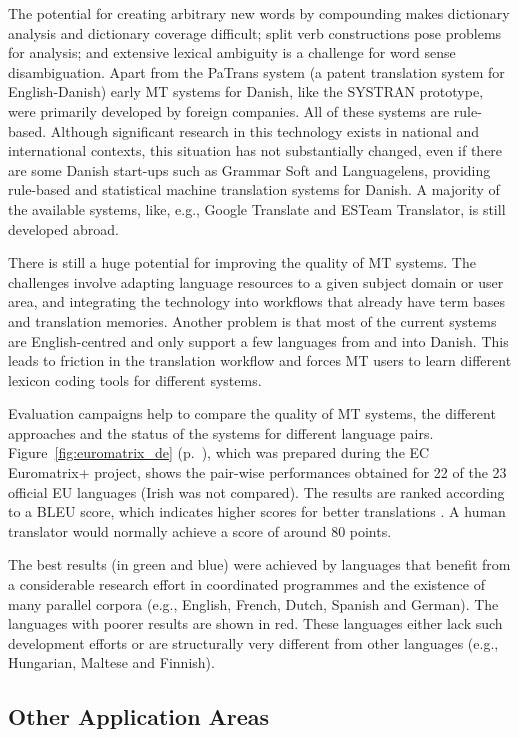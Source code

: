 \begin{multicols}{2}
The potential for creating arbitrary new words by compounding makes dictionary analysis and dictionary coverage difficult; split verb constructions pose problems for analysis; and extensive lexical ambiguity is a challenge for word sense disambiguation.
Apart from the PaTrans system (a patent translation system for English-Danish) early MT systems for Danish, like the SYSTRAN prototype, were primarily developed by foreign companies.
All of these systems are rule-based. Although significant research in this technology exists in national and international contexts, this situation has not substantially changed, even if there are some Danish start-ups such as Grammar Soft and Languagelens, providing rule-based and statistical machine translation systems for Danish. A majority of the available systems, like, e.g., Google Translate and ESTeam Translator, is still developed abroad.

There is still a huge potential for improving the quality of MT systems. The challenges involve adapting language resources to a given subject domain or user area, and integrating the technology into workflows that already have term bases and translation memories. Another problem is that most of the current systems are English-centred and only support a few languages from and into Danish. This leads to friction in the translation workflow and forces MT users to learn different lexicon coding tools for different systems.

Evaluation campaigns help to compare the quality of MT systems, the different approaches and the status of the systems for different language pairs. Figure~\ref{fig:euromatrix_de} (p.~\pageref{fig:euromatrix_de}), which was prepared during the EC Euromatrix+ project, shows the pair-wise performances obtained for 22 of the 23 official EU languages (Irish was not compared). The results are ranked according to a BLEU score, which indicates higher scores for better translations \cite{bleu1}. A human translator would normally achieve a score of around 80 points.

The best results (in green and blue) were achieved by languages that benefit from a considerable research effort in coordinated programmes and the existence of many parallel corpora (e.g., English, French, Dutch, Spanish and German). The languages with poorer results are shown in red. These languages either lack such development efforts or are structurally very different from other languages (e.g., Hungarian, Maltese and Finnish).


\subsection{Other Application Areas}


\end{multicols}

